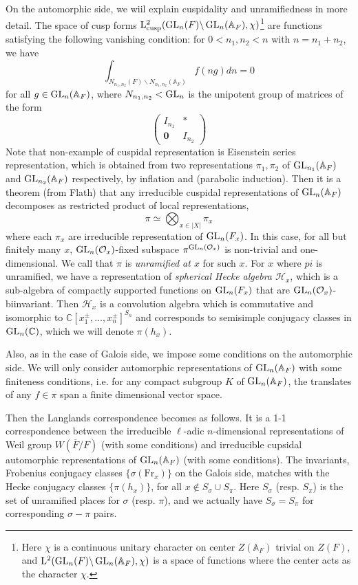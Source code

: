 On the automorphic side, we wiil explain cuspidality and unramifiedness in more detail.
The space of cusp forms $\mathrm{L}^{2}_{\operatorname{\mathrm{cusp}}}(\operatorname{\mathrm{GL}}_{n}(F) \backslash \operatorname{\mathrm{GL}}_{n}(\mathbb{A}_{F}), \chi)$\footnote{Here $\chi$ is a continuous unitary character on center $Z(\mathbb{A}_{F})$ trivial on $Z(F)$,
and $\mathrm{L}^{2}(\operatorname{\mathrm{GL}}_{n}(F)\backslash\operatorname{\mathrm{GL}}_{n}(\mathbb{A}_{F}), \chi)$ is a space of functions where the center acts as the character $\chi$.
}
are functions satisfying the following vanishing condition: for $0 < n_{1}, n_{2} < n$ with $n = n_{1} + n_{2}$,
we have
$$
\int_{N_{n_{1}, n_{2}}(F) \backslash N_{n_{1}, n_{2}}(\mathbb{A}_{F})} f(ng)dn = 0
$$
for all $g\in \operatorname{\mathrm{GL}}_{n}(\mathbb{A}_{F})$, where $N_{n_{1}, n_{2}} < \operatorname{\mathrm{GL}}_{n}$ is the unipotent group of matrices of the form
$$
\begin{pmatrix}
    I_{n_{1}} & * \\ \mathbf{0} & I_{n_2}
\end{pmatrix}
$$
Note that non-example of cuspidal representation is Eisenstein series representation, which is obtained from
two representations $\pi_{1}, \pi_{2}$ of $\operatorname{\mathrm{GL}}_{n_{1}}(\mathbb{A}_{F})$ and $\operatorname{\mathrm{GL}}_{n_2}(\mathbb{A}_F)$ respectively, by inflation and (parabolic induction).
Then it is a theorem (from Flath) that any irreducible cuspidal representations of $\operatorname{\mathrm{GL}}_{n}(\mathbb{A}_F)$ decomposes as restricted product
of local representations,
$$
\pi \simeq \bigotimes_{x\in |X|} \pi_{x}
$$
where each $\pi_{x}$ are irreducible representation of $\operatorname{\mathrm{GL}}_{n}(F_x)$.
In this case, for all but finitely many $x$, $\operatorname{\mathrm{GL}}_{n}(\mathcal{O}_{x})$-fixed subspace
$\pi^{\operatorname{\mathrm{GL}}_{n}(\mathcal{O}_x)}$ is non-trivial and one-dimensional.
We call that $\pi$ is \emph{unramified at $x$} for such $x$.
For $x$ where $pi$ is unramified, we have a representation of \emph{spherical Hecke algebra $\mathcal{H}_{x}$}, which 
is a sub-algebra of compactly supported functions on $\operatorname{\mathrm{GL}}_{n}(F_{x})$ that are $\operatorname{\mathrm{GL}}_{n}(\mathcal{O}_{x})$-biinvariant.
Then $\mathcal{H}_{x}$ is a convolution algebra which is commutative and 
isomorphic to $\mathbb{C}[x_{1}^{\pm}, \dots, x_{n}^{\pm}]^{S_{n}}$
and corresponds to semisimple conjugacy classes in $\operatorname{\mathrm{GL}}_{n}(\mathbb{C})$, which we will denote $\pi(h_{x})$.

Also, as in the case of Galois side, we impose some conditions on the automorphic side.
We will only consider automorphic representations of $\operatorname{\mathrm{GL}}_{n}(\mathbb{A}_{F})$ with some finiteness conditions, i.e.
for any compact subgroup $K$ of $\operatorname{\mathrm{GL}}_{n}(\mathbb{A}_F)$, the translates of any $f\in \pi$ span a
finite dimensional vector space.

Then the Langlands correspondence becomes as follows.
It is a 1-1 correspondence between the irreducible $\ell$-adic $n$-dimensional representations of Weil group $W(\overline{F}/F)$
(with some conditions) and irreducible cupsidal automorphic representations of $\operatorname{\mathrm{GL}}_{n}(\mathbb{A}_{F})$ (with some conditions).
The invariants, Frobenius conjugacy classes $\{\sigma(\mathrm{Fr}_{x})\}$ on the Galois side, matches with
the Hecke conjugacy classes $\{\pi(h_{x})\}$, for all $x \not \in S_{\sigma} \cup S_{\pi}$.
Here $S_{\sigma}$ (resp. $S_{\pi}$) is the set of unramified places for $\sigma$ (resp. $\pi$), and
we actually have $S_{\sigma} = S_{\pi}$ for corresponding $\sigma - \pi$ pairs.